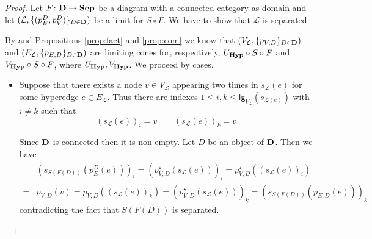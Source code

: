 \documentclass[3p]{elsarticle}
\newcommand{\lgh}{\mathsf{lg}}
\def\D{\textbf {\textup{D}}}
\newcommand{\catname}[1]{\textbf{\textup{#1}}}
\newcommand{\hyp}{\catname{Hyp}}
\newcommand{\shyp}{\catname{Sep}}
\theoremstyle{remark}
\theoremstyle{definition}
\begin{document}
\seppb*
\begin{proof}\label{proof:seplim}
	Let $F\colon \D\to \shyp $ be a diagram with a connected category as domain and let $(\mathcal{L}, \{(p_E^D, p^D_V)\}_{D\in \D})$ be a limit for $S\circ F$. We have to show that $\mathcal{L}$ is separated.
	
	By  and Propositions \ref{prop:fact} and \ref{prop:com} we know that  $(V_\mathcal{L}, \{p_{V, D}\}_{D\in \D})$  and $(E_\mathcal{L}, \{p_{E, D}\}_{D\in \D})$ are limiting cones for, respectively,  $U_{\hyp}\circ S\circ F$ and $V_{\hyp}\circ S\circ F$, where $U_{\hyp}, V_{\hyp}$. We proceed by cases.
	\begin{itemize}
		\item Suppose that there exists a node $v\in V_{\mathcal{L}}$ appearing two times in  $s_{\mathcal{L}}(e)$ for some hyperedge $e\in E_{\mathcal{L}}$. Thus there are indexes $1\leq i, k \leq \lgh_{V_{\mathcal{L}}}(s_{\mathcal{L}(e)})$ with $i\neq k$  such that
		\[(s_{\mathcal{L}}(e))_i=v \qquad  (s_{\mathcal{L}}(e) )_k= v\]
		
		Since $\D$ is connected then it is non empty. Let  $D$ be an object of $\D$. Then we have
		\begin{align*}
		&(s_{S(F(D))}( p^D_{E}(e)))_i = ( p^\star_{V,D}(s_{\mathcal{L}}(e)))_i=p^\star_{V, D}((s_{\mathcal{L}}(e))_i)\\ = & p_{V,D}(v)=p_{V, D}((s_{\mathcal{L}}(e))_k)=(p^\star_{V,D}(s_{\mathcal{L}}(e)))_k=(s_{S(F(D))}( p_{E,D}(e)))_k  	
		\end{align*}
		contradicting the fact that $S(F(D))$ is separated.
		

\end{itemize}
\end{proof}
\end{document}
